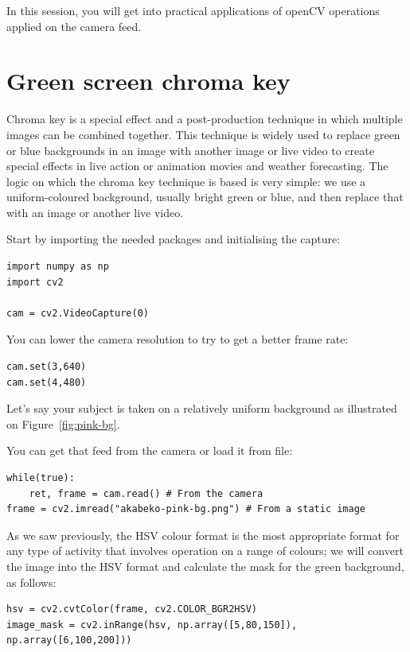\documentclass{labo}
\author{}
\begin{document}

In this session, you will get into practical applications of openCV operations applied on the camera feed.

\section*{}



\section*{Green screen chroma key}
Chroma key is a special effect and a post-production technique in which multiple images can be combined together. 
This technique is widely used to replace green or blue backgrounds in an image with another image or live video to create special effects in live action or animation movies and weather forecasting. 
The logic on which the chroma key technique is based is very simple: we use a uniform-coloured background, usually bright green or blue, and then replace that with an image or another live video.

Start by importing the needed packages and initialising the capture:
\begin{verbatim}
import numpy as np
import cv2

cam = cv2.VideoCapture(0)
\end{verbatim}

You can lower the camera resolution to try to get a better frame rate:
\begin{verbatim}
cam.set(3,640)
cam.set(4,480)
\end{verbatim}

Let's say your subject is taken on a relatively uniform background as illustrated on Figure~\ref{fig:pink-bg}.


You can get that feed from the camera or load it from file:
\begin{verbatim}
while(true):
	ret, frame = cam.read() # From the camera
frame = cv2.imread("akabeko-pink-bg.png") # From a static image
\end{verbatim}

As we saw previously, the  HSV colour format is the most appropriate format for any type of activity that involves operation on a range of colours; we will convert the image into the HSV format and calculate the mask for the green background, as follows:
\begin{verbatim}
hsv = cv2.cvtColor(frame, cv2.COLOR_BGR2HSV)
image_mask = cv2.inRange(hsv, np.array([5,80,150]), np.array([6,100,200]))
\end{verbatim}
\end{document}
